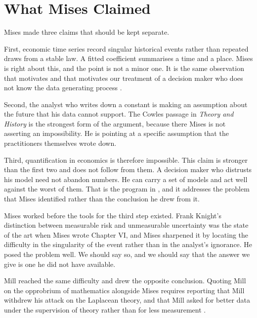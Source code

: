 \documentclass[12pt]{article}
\begin{document}
\section{What Mises Claimed}
\label{sec:use}

Mises made three claims that should be kept separate.

First, economic time series record singular historical events rather than
repeated draws from a stable law.  A fitted coefficient summarises a time and a
place.  Mises is right about this, and the point is not a minor one.  It is the
same observation that motivates \citet{Lucas1976} and that motivates our
treatment of a decision maker who does not know the data generating process
\citep{HansenSargent2008}.

Second, the analyst who writes down a constant is making an assumption about
the future that his data cannot support.  The Cowles passage in
\emph{Theory and History} is the strongest form of the argument, because there
Mises is not asserting an impossibility.  He is pointing at a specific
assumption that the practitioners themselves wrote down.

Third, quantification in economics is therefore impossible.  This claim is
stronger than the first two and does not follow from them.  A decision maker
who distrusts his model need not abandon numbers.  He can carry a set of models
and act well against the worst of them.  That is the program in
\citet{HansenSargent2008}, and it addresses the problem that Mises identified
rather than the conclusion he drew from it.

Mises worked before the tools for the third step existed.  Frank Knight's
distinction between measurable risk and unmeasurable uncertainty
\citep{Knight1921} was the state of the art when Mises wrote Chapter VI, and
Mises sharpened it by locating the difficulty in the singularity of the event
rather than in the analyst's ignorance.  He posed the problem well.  We should
say so, and we should say that the answer we give is one he did not have
available.

Mill reached the same difficulty and drew the opposite conclusion.  Quoting
Mill on the opprobrium of mathematics alongside Mises requires reporting that
Mill withdrew his attack on the Laplacean theory, and that Mill asked for
better data under the supervision of theory rather than for less measurement
\citep[Bk.~III, ch.~XVIII; Bk.~VI, ch.~IX]{Mill1882Logic}.

\bigskip


\end{document}
